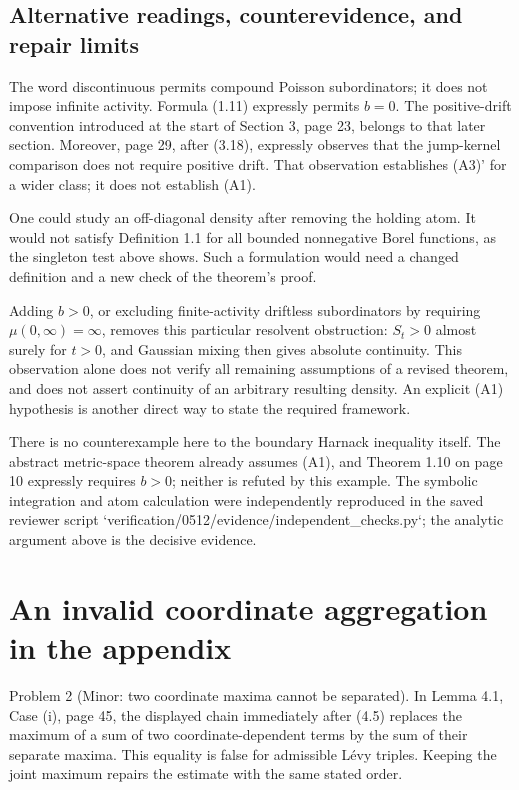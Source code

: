 \documentclass[10pt]{article}
\begin{document}
\subsection*{Alternative readings, counterevidence, and repair limits}
The word discontinuous permits compound Poisson subordinators; it does not impose infinite activity. Formula (1.11) expressly permits \(b=0\). The positive-drift convention introduced at the start of Section 3, page 23, belongs to that later section. Moreover, page 29, after (3.18), expressly observes that the jump-kernel comparison does not require positive drift. That observation establishes (A3)’ for a wider class; it does not establish (A1).\par
One could study an off-diagonal density after removing the holding atom. It would not satisfy Definition 1.1 for all bounded nonnegative Borel functions, as the singleton test above shows. Such a formulation would need a changed definition and a new check of the theorem’s proof.\par
Adding \(b>0\), or excluding finite-activity driftless subordinators by requiring \(\mu(0,\infty)=\infty\), removes this particular resolvent obstruction: \(S_t>0\) almost surely for \(t>0\), and Gaussian mixing then gives absolute continuity. This observation alone does not verify all remaining assumptions of a revised theorem, and does not assert continuity of an arbitrary resulting density. An explicit (A1) hypothesis is another direct way to state the required framework.\par
There is no counterexample here to the boundary Harnack inequality itself. The abstract metric-space theorem already assumes (A1), and Theorem 1.10 on page 10 expressly requires \(b>0\); neither is refuted by this example. The symbolic integration and atom calculation were independently reproduced in the saved reviewer script `verification/0512/evidence/independent\_checks.py`; the analytic argument above is the decisive evidence.\par
\section*{An invalid coordinate aggregation in the appendix}
Problem 2 (Minor: two coordinate maxima cannot be separated).  In Lemma 4.1, Case (i), page 45, the displayed chain immediately after (4.5) replaces the maximum of a sum of two coordinate-dependent terms by the sum of their separate maxima. This equality is false for admissible Lévy triples. Keeping the joint maximum repairs the estimate with the same stated order.\par
\end{document}

